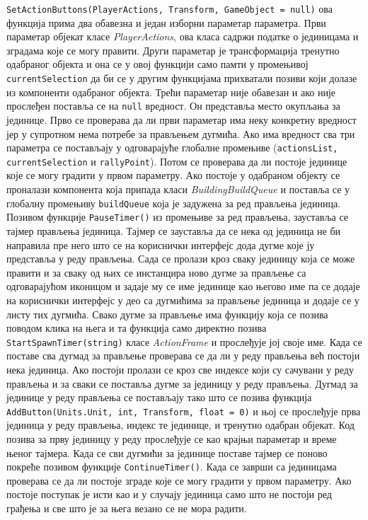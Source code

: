 \documentclass[11pt,a4paper]{article}
\begin{document}
\texttt{SetActionButtons(PlayerActions, Transform, GameObject = null)} ова функција прима два обавезна и један изборни параметар параметра. Први параметар објекат класе \emph{PlayerActions}, ова класа садржи податке о јединицама и зградама које се могу правити. Други параметар је трансформација тренутно одабраног објекта и она се у овој функцији само памти у промењивој \texttt{currentSelection} да би се у другим функцијама прихватали позиви који долазе из компоненти одабраног објекта. Трећи параметар није обавезан и ако није прослеђен поставља се на \texttt{null} вредност. Он представља место окупљања за јединице. Прво се проверава да ли први параметар има неку конкретну вредност јер у супротном нема потребе за прављењем дугмића. Ако има вредност сва три параметра се постављају у одговарајуће глобалне промењиве (\texttt{actionsList, currentSelection} и \texttt{rallyPoint}). Потом се проверава да ли постоје јединице које се могу градити у првом параметру. Ако постоје у одабраном објекту се проналази компонента која припада класи \emph{BuildingBuildQueue}  и поставља се у глобалну промењиву \texttt{buildQueue} која је задужена за ред прављења јединица. Позивом функције \texttt{PauseTimer()} из промењиве за ред прављења, зауставља се тајмер прављења јединица. Тајмер се зауставља да се нека од јединица не би направила пре него што се на кориснички интерфејс дода дугме које ју представља у реду прављења. Сада се пролази кроз сваку јединицу која се може правити и за сваку од њих се инстанцира ново дугме за прављење са одговарајућом иконицом и задаје му се име јединице као његово име па се додаје на кориснички интерфејс у део са дугмићима за прављење јединица и додаје се у листу тих дугмића. Свако дугме за прављење има функцију која се позива поводом клика на њега и та функција само директно позива \texttt{StartSpawnTimer(string)} класе \emph{ActionFrame} и прослеђује јој своје име. Када се поставе сва дугмад за прављење проверава се да ли у реду прављења већ постоји нека јединица. Ако постоји пролази се кроз све индексе који су сачувани у реду прављења и за сваки се поставља дугме за јединицу у реду прављења. Дугмад за јединице у реду прављења се постављају тако што се позива функција \texttt{AddButton(Units.Unit, int, Transform, float = 0)} и њој се прослеђује прва јединица у реду прављења, индекс те јединице, и тренутно одабран објекат. Код позива за прву јединицу у реду прослеђује се као крајњи параметар и време њеног тајмера. Када се сви дугмићи за јединице поставе тајмер се поново покреће позивом функције \texttt{ContinueTimer()}. Када се заврши са јединицама проверава се да ли постоје зграде које се могу градити у првом параметру. Ако постоје поступак је исти као и у случају јединица само што не постоји ред грађења и све што је за њега везано се не мора радити.
\end{document}
